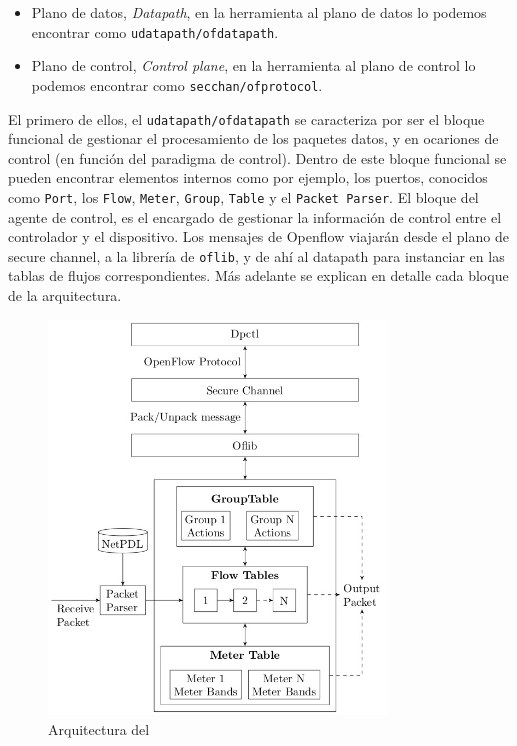 \begin{itemize}
    \item   Plano de datos, \textit{Datapath}, en la herramienta al plano de datos lo podemos encontrar como \texttt{udatapath/ofdatapath}.
    \item   Plano de control, \textit{Control plane}, en la herramienta al plano de control lo podemos encontrar como \texttt{secchan/ofprotocol}.
\end{itemize}

El primero de ellos, el \texttt{udatapath/ofdatapath} se caracteriza por ser el bloque funcional de gestionar el procesamiento de los paquetes datos, y en ocariones de control (en función del paradigma de control). Dentro de este bloque funcional se pueden encontrar elementos internos como por ejemplo, los puertos, conocidos como \texttt{Port}, los \texttt{Flow}, \texttt{Meter}, \texttt{Group}, \texttt{Table} y el \texttt{Packet Parser}. El bloque del agente de control, es el encargado de gestionar la información de control entre el controlador y el dispositivo. Los mensajes de Openflow viajarán desde el plano de secure channel, a la librería de \texttt{oflib}, y de ahí al datapath para instanciar en las tablas de flujos correspondientes. Más adelante se explican en detalle cada bloque de la arquitectura.

\begin{figure}[ht]
    \centering
    \includegraphics[width=0.8\textwidth]{archivos/img/teoria/bofuss2.png}
    \caption{Arquitectura del }
    \label{fig:bofuss2}
\end{figure}


